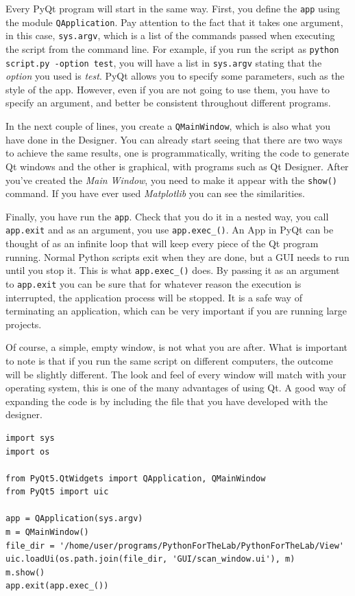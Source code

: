 Every PyQt program will start in the same way. First, you define the
\texttt{app} using the module \texttt{QApplication}. Pay attention to
the fact that it takes one argument, in this case, \texttt{sys.argv},
which is a list of the commands passed when executing the script from
the command line. For example, if you run the script as
\texttt{python script.py -option test}, you will have a list in
\texttt{sys.argv} stating that the \emph{option} you used is
\emph{test}. PyQt allows you to specify some parameters, such as the
style of the app. However, even if you are not going to use them, you
have to specify an argument, and better be consistent throughout
different programs.

In the next couple of lines, you create a \texttt{QMainWindow}, which is
also what you have done in the Designer. You can already start seeing
that there are two ways to achieve the same results, one is
programmatically, writing the code to generate Qt windows and the other
is graphical, with programs such as Qt Designer. After you've created
the \emph{Main Window}, you need to make it appear with the
\texttt{show()} command. If you have ever used \emph{Matplotlib} you can
see the similarities.

Finally, you have run the \texttt{app}. Check that you do it in a nested
way, you call \texttt{app.exit} and as an argument, you use
\texttt{app.exec_()}. An App in PyQt can be thought of as an infinite
loop that will keep every piece of the Qt program running. Normal Python
scripts exit when they are done, but a {GUI} needs to run until you stop
it. This is what \texttt{app.exec_()} does. By passing it as an
argument to \texttt{app.exit} you can be sure that for whatever reason
the execution is interrupted, the application process will be stopped.
It is a safe way of terminating an application, which can be very
important if you are running large projects.

Of course, a simple, empty window, is not what you are after. What is
important to note is that if you run the same script on different
computers, the outcome will be slightly different. The look and feel of
every window will match with your operating system, this is one of the
many advantages of using Qt. A good way of expanding the code is by
including the file that you have developed with the designer.

\begin{verbatim}
import sys
import os

from PyQt5.QtWidgets import QApplication, QMainWindow
from PyQt5 import uic

app = QApplication(sys.argv)
m = QMainWindow()
file_dir = '/home/user/programs/PythonForTheLab/PythonForTheLab/View'
uic.loadUi(os.path.join(file_dir, 'GUI/scan_window.ui'), m)
m.show()
app.exit(app.exec_())
\end{verbatim}

